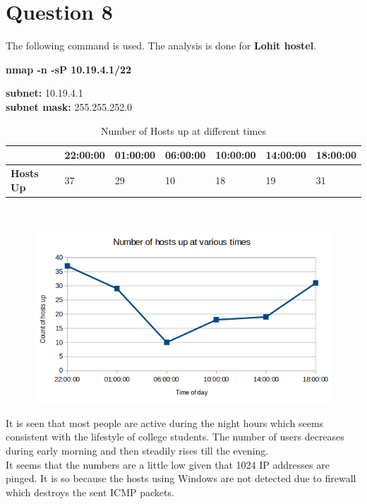 \documentclass[a4paper,10pt]{article}
\newlength{\strutheight}
\begin{document}
\section*{Question 8}
The following command is used. The analysis is done for \textbf{Lohit hostel}.
\\
\begin{center}
	\textbf{nmap -n -sP 10.19.4.1/22}
\end{center}
\textbf{subnet:} 10.19.4.1\\
\textbf{subnet mask:} 255.255.252.0\\
\begin{table}[h]
	\begin{tabularx}{\textwidth}{|p{100pt}||X||X||X||X||X||X|}
		\hline
		& \textbf{22:00:00} & \textbf{01:00:00} & \textbf{06:00:00} & \textbf{10:00:00} & \textbf{14:00:00} & \textbf{18:00:00}\\ \hline
		\textbf{Hosts Up} & 37 & 29 & 10 & 18 & 19 & 31 \\ \hline
	\end{tabularx}
	\caption{Number of Hosts up at different times}
\end{table}
\\
\begin{adjustbox}{valign=T,raise=\strutheight,minipage={\linewidth}}
	\begin{figure}
		\includegraphics[width=12cm]{nmap.png}
	\end{figure}
	It is seen that most people are active during the night hours which seems consistent with the lifestyle of college students. The number of users decreases during early morning and then steadily rises till the evening.
	\\
	It seems that the numbers are a little low given that 1024 IP addresses are pinged. It is so because the hosts using Windows are not detected due to firewall which destroys the sent ICMP packets.
\end{adjustbox} 
\end{document}
